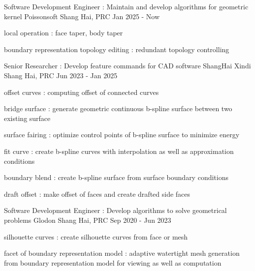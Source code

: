 
  \cventry
    {Software Development Engineer : Maintain and develop algorithms for geometric kernel } %
    {Poissonsoft} %
    {Shang Hai, PRC} %
    {Jan 2025 - Now} %
    {
      \begin{cvitems} %
         \item {local operation : face taper, body taper}    
         \item {boundary representation topology editing : redundant topology controlling}    
      \end{cvitems}
    }  

  \cventry
    {Senior Researcher : Develop feature commands for CAD software} %
    {ShangHai Xindi} %
    {Shang Hai, PRC} %
    {Jun 2023 - Jan 2025} %
    {
      \begin{cvitems} %
         \item {offset curves : computing offset of connected curves}    
         \item {bridge surface : generate geometric continuous b-spline surface between two existing surface}   
         \item {surface fairing : optimize control points of b-spline surface to minimize energy}  
         \item {fit curve : create b-spline curves with interpolation as well as approximation conditions}  
         \item {boundary blend : create b-spline surface from surface boundary conditions}  
         \item {draft offset : make offset of faces and create drafted side faces}  
      \end{cvitems}
    }  
  
  \cventry
    {Software Development Engineer : Develop algorithms to solve geometrical problems} %
    {Glodon} %
    {Shang Hai, PRC} %
    {Sep 2020 - Jun 2023} %
    {
      \begin{cvitems} %
         \item {silhouette curves : create silhouette curves from face or mesh }    
         \item {facet of boundary representation model : adaptive watertight mesh generation from boundary representation model for viewing as well as computation}  
      \end{cvitems}
    }
    
